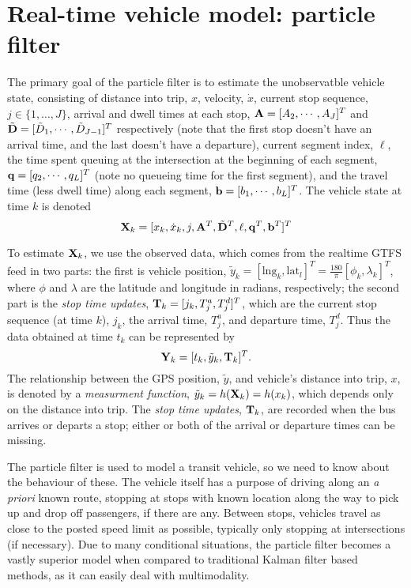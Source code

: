 \documentclass[draftcls,a4paper,onecolumn]{IEEEtran}\usepackage[]{graphicx}\usepackage[]{color}
\begin{document}
\section{Real-time vehicle model: particle filter}
\label{sec:pf}

The primary goal of the particle filter is to estimate the unobservatble
vehicle state,
consisting of distance into trip, $x$, 
velocity, $\dot x$,
current stop sequence, $j \in \{1,\ldots,J\}$, 
arrival and dwell times at each stop, 
$\mathbf{A} = [A_2, \cdots, A_J]^T$ and 
$\tilde {\mathbf{D}} = [\tilde D_1, \cdots, \tilde D_{J-1}]^T$ respectively
(note that the first stop doesn't have an arrival time,
and the last doesn't have a departure),
current segment index, $\ell$,
the time spent queuing at the intersection at the beginning
of each segment,
$\mathbf{q} = [q_2, \cdots, q_L]^T$ (note no queueing time for the first segment),
and the travel time (less dwell time) along each segment,
$\mathbf{b} = [b_1, \cdots, b_L]^T$.
The vehicle state at time $k$ is denoted
\begin{equation}
  \label{eq:vehiclestate}
  \mathbf{X}_k = 
  [x_k, \dot x_k, j, \mathbf{A}^T, \tilde{\mathbf{D}}^T, \ell, \mathbf{q}^T, \mathbf{b}^T]^T
\end{equation}

To estimate $\mathbf{X}_k$, we use the observed data,
which comes from the realtime GTFS feed in two parts:
the first is vehicle position, 
$\tilde y_k = [\mathrm{lng}_k, \mathrm{lat}_l]^T = 
\frac{180}{\pi}[\phi_k, \lambda_k]^T$,
where $\phi$ and $\lambda$ are the latitude and longitude in radians, 
respectively;
the second part is the \emph{stop time updates},
$\mathbf{T}_k = [j_k, T_j^a, T_j^d]^T$,
which are the current stop sequence (at time $k$), $j_k$,
the arrival time, $T_j^a$, and departure time, $T_j^d$.
Thus the data obtained at time $t_k$ can be represented by
\begin{equation}
  \label{eq:data}
  \mathbf{Y}_k = [t_k, \tilde y_k, \mathbf{T}_k]^T.
\end{equation}
The relationship between the GPS position, $\tilde y$,
and vehicle's distance into trip, $x$,
is denoted by a \emph{measurment function}, 
$\tilde y_k = h(\mathbf{X}_k) = h(x_k)$,
which depends only on the distance into trip.
The \emph{stop time updates}, $\mathbf{T}_k$,
are recorded when the bus arrives or departs a stop;
either or both of the arrival or departure times can be missing.


The particle filter is used to model a transit vehicle,
so we need to know about the behaviour of these.
The vehicle itself has a purpose of driving along an \emph{a priori} known route,
stopping at stops with known location along the way to pick up
and drop off passengers, if there are any.
Between stops, vehicles travel as close to the posted speed limit as possible,
typically only stopping at intersections (if necessary).
Due to many conditional situations, 
the particle filter becomes a vastly superior model when compared to traditional
Kalman filter based methods, 
as it can easily deal with multimodality.
\end{document}
